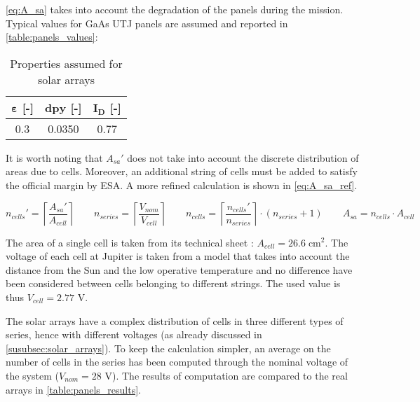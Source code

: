 \autoref{eq:A_sa} takes into account the degradation of the panels during the mission.
Typical values for GaAs UTJ panels are assumed and reported in \autoref{table:panels_values}:

\begin{table}[H]
    \renewcommand{\arraystretch}{1.3}
    \centering
    \small
    \begin{tabular}{|c|c|c|}
        \hline
        $\boldsymbol{\varepsilon}$ \textbf{[-]}    &
        $\boldsymbol{dpy}$ \textbf{[-]}     &
        $\boldsymbol{I_D}$ \textbf{[-]}     \\
        \hline
        \hline
        0.3 & 0.0350 & 0.77 \\
        \hline
    \end{tabular}
    \caption{Properties assumed for solar arrays}
    \label{table:panels_values}
\end{table}
\vspace*{-3mm}

It is worth noting that $A_{sa}'$ does not take into account the discrete distribution of areas due to cells.
Moreover, an additional string of cells must be added to satisfy the official margin by ESA. \cite{esa_margins}
A more refined calculation is shown in \autoref{eq:A_sa_ref}.

\begin{equation}
    n_{cells}' = \left\lceil \frac{A_{sa}'}{A_{cell}} \right\rceil \qquad
    n_{series} = \left\lceil \frac{V_{nom}}{V_{cell}} \right\rceil \qquad
    n_{cells} = \left\lceil \frac{n_{cells}'}{n_{series}} \right\rceil
                \cdot \left( n_{series} + 1 \right) \qquad
    A_{sa} = n_{cells} \cdot A_{cell}
    \label{eq:A_sa_ref}
\end{equation}

The area of a single cell is taken from its technical sheet \cite{solar_datasheet}: $A_{cell} = 26.6 \; \textrm{cm}^2$.
The voltage of each cell at Jupiter is taken from a model\cite{solar_panels_coef} that takes into account the distance from the Sun and the low operative temperature and no difference have been considered between cells belonging to different strings. The used value is thus $V_{cell} = 2.77$ V.

The solar arrays have a complex distribution of cells in three different types of series, hence with different voltages (as already discussed in \autoref{susubsec:solar_arrays}). %
To keep the calculation simpler, an average on the number of cells in the series has been computed through the nominal voltage of the system ($V_{nom} = 28$ V).
The results of computation are compared to the real arrays in \autoref{table:panels_results}.

